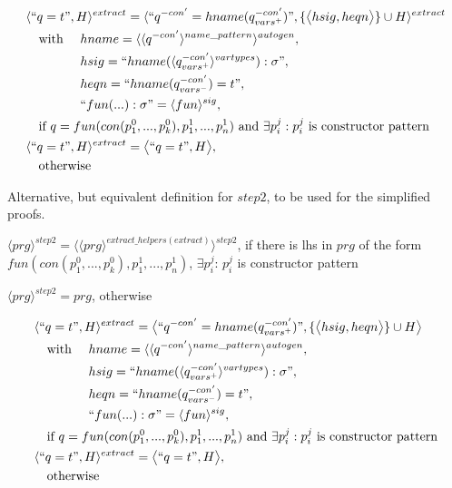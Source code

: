 \documentclass[11pt]{article} %
\begin{document}
\begin{alignat*}{3}
&\langle `` q = t ", H \rangle^{extract} = \langle `` q^{-con'} = hname (q^{-con'}_{vars^+}) ", \{\big\langle hsig, heqn \big\rangle\} \cup H \rangle^{extract} \span\span \\
&\quad \textrm{with } && hname = \langle \langle q^{-con'} \rangle^{name\_pattern} \rangle^{autogen}, \\
&\quad && hsig = `` hname(\langle q^{-con'}_{vars^+} \rangle^{vartypes}): \sigma ", \\
&\quad && heqn = `` hname(q^{-con'}_{vars^-}) = t ", \\
&\quad && `` fun(...): \sigma " = \langle fun \rangle^{sig}, \\
&\quad \textrm{if } q = fun(con(p_1^0, ..., p_k^0), p^1_1, ..., p^1_n) \textrm{ and } \exists p_i^j: p_i^j \textrm{ is constructor pattern} \span\span \\
&\langle `` q = t ", H \rangle^{extract} = \big\langle `` q = t ", H \big\rangle, \span\span \\
&\quad \textrm{otherwise} \span\span
\end{alignat*}

\begin{framed}

Alternative, but equivalent definition for $step2$, to be used for the simplified proofs.

$\langle prg \rangle^{step2} = \langle \langle prg \rangle^{extract\_helpers(extract)} \rangle^{step2}$, if there is lhs in $prg$ of the form $fun(con(p_1^0, ..., p_k^0), p^1_1, ..., p^1_n)$, $\exists p_i^j$: $p_i^j$ is constructor pattern

$\langle prg \rangle^{step2} = prg$, otherwise

\begin{alignat*}{3}
&\langle `` q = t ", H \rangle^{extract} = \big\langle `` q^{-con'} = hname (q^{-con'}_{vars^+}) ", \{\big\langle hsig, heqn \big\rangle\} \cup H \big\rangle \span\span \\
&\quad \textrm{with } && hname = \langle \langle q^{-con'} \rangle^{name\_pattern} \rangle^{autogen}, \\
&\quad && hsig = `` hname(\langle q^{-con'}_{vars^+} \rangle^{vartypes}): \sigma ", \\
&\quad && heqn = `` hname(q^{-con'}_{vars^-}) = t ", \\
&\quad && `` fun(...): \sigma " = \langle fun \rangle^{sig}, \\
&\quad \textrm{if } q = fun(con(p_1^0, ..., p_k^0), p^1_1, ..., p^1_n) \textrm{ and } \exists p_i^j: p_i^j \textrm{ is constructor pattern} \span\span \\
&\langle `` q = t ", H \rangle^{extract} = \big\langle `` q = t ", H \big\rangle, \span\span \\
&\quad \textrm{otherwise} \span\span
\end{alignat*}

\end{framed}
\end{document}
